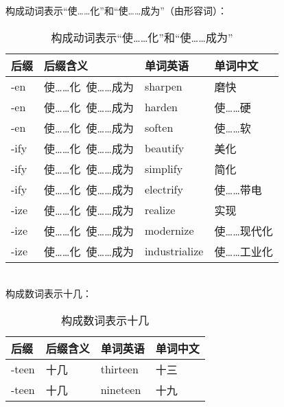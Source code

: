 \documentclass[UTF8]{ctexart}
\begin{document}
    构成动词表示“使……化”和“使……成为”（由形容词）：\vspace{5pt}
    \begin{table}[h!]
        \begin{center}
            \ttfamily
            \begin{tabular}{p{40pt}|p{120pt}|p{80pt}|p{80pt}}
                \hline
                后缀&后缀含义&单词英语&单词中文\\ \hline
                -en&使……化~使……成为&sharpen&磨快\\ \hline
                -en&使……化~使……成为&harden&使……硬\\ \hline
                -en&使……化~使……成为&soften&使……软\\ \hline
                -ify&使……化~使……成为&beautify&美化\\ \hline
                -ify&使……化~使……成为&simplify&简化\\ \hline
                -ify&使……化~使……成为&electrify&使……带电\\ \hline
                -ize&使……化~使……成为&realize&实现\\ \hline
                -ize&使……化~使……成为&modernize&使……现代化\\ \hline
                -ize&使……化~使……成为&industrialize&使……工业化\\ \hline
            \end{tabular}
            \rmfamily
            \caption{构成动词表示“使……化”和“使……成为”}
        \end{center}
    \end{table}\\
    构成数词表示十几：\vspace{5pt}
    \begin{table}[h!]
        \begin{center}
            \ttfamily
            \begin{tabular}{p{40pt}|p{80pt}|p{80pt}|p{80pt}}
                \hline
                后缀&后缀含义&单词英语&单词中文\\ \hline
                -teen&十几&thirteen&十三\\ \hline
                -teen&十几&nineteen&十九\\ \hline
            \end{tabular}
            \rmfamily
            \caption{构成数词表示十几}
        \end{center}
    \end{table}\\
\end{document}
